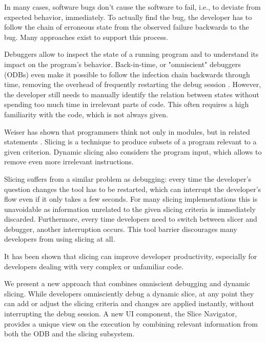 ﻿\documentclass[
      english,
			conference,
      ]{IEEEtran}
\newcommand{\todo}[2][]{\pdfmargincomment[color=orange,icon=Note,subject={TODO},author={#1}]{#2}}
\begin{document}
In many cases, software bugs don't cause the software to fail, i.e., to deviate from expected behavior, immediately.
To actually find the bug, the developer has to follow the chain of erroneous state from the observed failure backwards to the bug.
Many approaches exist to support this process.

Debuggers allow to inspect the state of a running program and to understand its impact on the program's behavior.
Back-in-time, or "omniscient" debuggers (ODBs) even make it possible to follow the infection chain backwards through time, removing the overhead of frequently restarting the debug session \cite{lewis_debugging_2003}.
However, the developer still needs to manually identify the relation between states without spending too much time in irrelevant parts of code.
This often requires a high familiarity with the code, which is not always given.
%

Weiser has shown that programmers think not only in modules, but in related statements \cite{weiser_programmers_1982}.
Slicing is a technique to produce subsets of a program relevant to a given criterion.
Dynamic slicing also considers the program input, which allows to remove even more irrelevant instructions.

Slicing suffers from a similar problem as debugging:
every time the developer's question changes the tool has to be restarted, which can interrupt the developer's flow even if it only takes a few seconds.
For many slicing implementations this is unavoidable as information unrelated to the given slicing criteria is immediately discarded\todo{cite}.
Furthermore, every time developers need to switch between slicer and debugger, another interruption occurs.
This tool barrier discourages many developers from using slicing at all.

It has been shown that slicing can \todo{qualify} improve developer productivity\todo{cite}, especially for developers dealing with very complex or unfamiliar code.

We present a new approach that combines omniscient debugging and dynamic slicing.
While developers omnisciently debug a dynamic slice, at any point they can add or adjust the slicing criteria and changes are applied instantly, without interrupting the debug session.
A new UI component, the Slice Navigator, provides a unique view on the execution by combining relevant information from both the ODB and the slicing subsystem.
\end{document}
